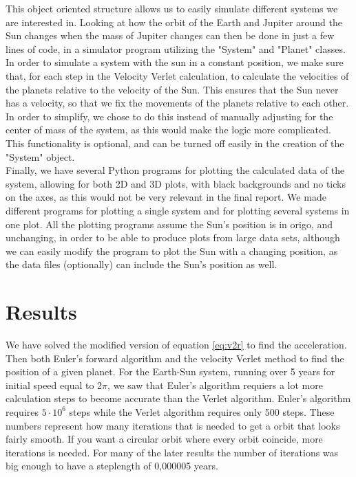 \documentclass{article}
\begin{document}
        This object oriented structure allows us to easily simulate different systems we are interested in. Looking at how the orbit of the Earth and Jupiter around the Sun changes when the mass of Jupiter changes can then be done in just a few lines of code, in a simulator program utilizing the "System" and "Planet" classes.\\

        In order to simulate a system with the sun in a constant position, we make sure that, for each step in the Velocity Verlet calculation, to calculate the velocities of the planets relative to the velocity of the Sun. This ensures that the Sun never has a velocity, so that we fix the movements of the planets relative to each other. In order to simplify, we chose to do this instead of manually adjusting for the center of mass of the system, as this would make the logic more complicated. This functionality is optional, and can be turned off easily in the creation of the "System" object.\\

        Finally, we have several Python programs for plotting the calculated data of the system, allowing for both 2D and 3D plots, with black backgrounds and no ticks on the axes, as this would not be very relevant in the final report. We made different programs for plotting a single system and for plotting several systems in one plot. All the plotting programs assume the Sun's position is in origo, and unchanging, in order to be able to produce plots from large data sets, although we can easily modify the program to plot the Sun with a changing position, as the data files (optionally) can include the Sun's position as well.


\section{Results}
    We have solved the modified version of equation \ref{eq:v2r} to find the acceleration. Then both Euler's forward algorithm and the velocity Verlet method to find the position of a given planet. For the Earth-Sun system, running over 5 years for initial speed equal to 2$\pi$, we saw that Euler's algorithm requiers a lot more calculation steps to become accurate than the Verlet algorithm. Euler's algorithm requires $5 \cdot 10^6$ steps while the Verlet algorithm requires only 500 steps. These numbers represent how many iterations that is needed to get a orbit that looks fairly smooth. If you want a circular orbit where every orbit coincide, more iterations is needed. For many of the later results the number of iterations was big enough to have a steplength of 0,000005 years.\\
\end{document}
